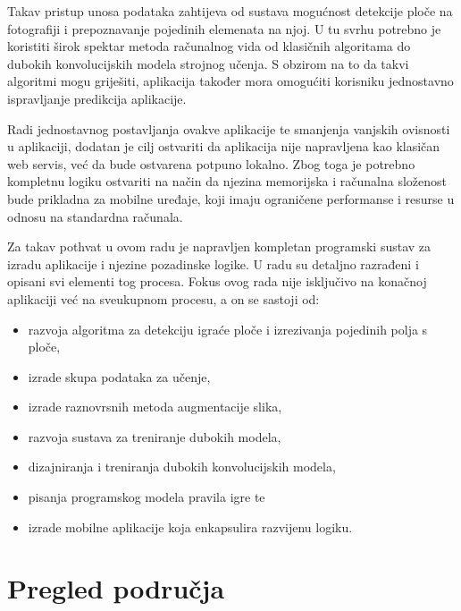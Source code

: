 \documentclass[diplomskirad]{fer}
\begin{document}
	Takav pristup unosa podataka zahtijeva od sustava mogućnost detekcije ploče na fotografiji i prepoznavanje pojedinih elemenata na njoj. U tu svrhu potrebno je koristiti širok spektar metoda računalnog vida od klasičnih algoritama do dubokih konvolucijskih modela strojnog učenja. S obzirom na to da takvi algoritmi mogu griješiti, aplikacija također mora omogućiti korisniku jednostavno ispravljanje predikcija aplikacije.
	
	Radi jednostavnog postavljanja ovakve aplikacije te smanjenja vanjskih ovisnosti u aplikaciji, dodatan je cilj ostvariti da aplikacija nije napravljena kao klasičan web servis, već da bude ostvarena potpuno lokalno. Zbog toga je potrebno kompletnu logiku ostvariti na način da njezina memorijska i računalna složenost bude prikladna za mobilne uređaje, koji imaju ograničene performanse i resurse u odnosu na standardna računala. 
	
	Za takav pothvat u ovom radu je napravljen kompletan programski sustav za izradu aplikacije i njezine pozadinske logike. U radu su detaljno razrađeni i opisani svi elementi tog procesa. Fokus ovog rada nije isključivo na konačnoj aplikaciji već na sveukupnom procesu, a on se sastoji od:
	\begin{itemize}
		\item razvoja algoritma za detekciju igraće ploče i izrezivanja pojedinih polja s ploče,
		\item izrade skupa podataka za učenje,
		\item izrade raznovrsnih metoda augmentacije slika,
		\item razvoja sustava za treniranje dubokih modela,
		\item dizajniranja i treniranja dubokih konvolucijskih modela,
		\item pisanja programskog modela pravila igre te
		\item izrade mobilne aplikacije koja enkapsulira razvijenu logiku.
	\end{itemize}

\chapter{Pregled područja}
\label{pog:pregled_podrucja}
\end{document}
